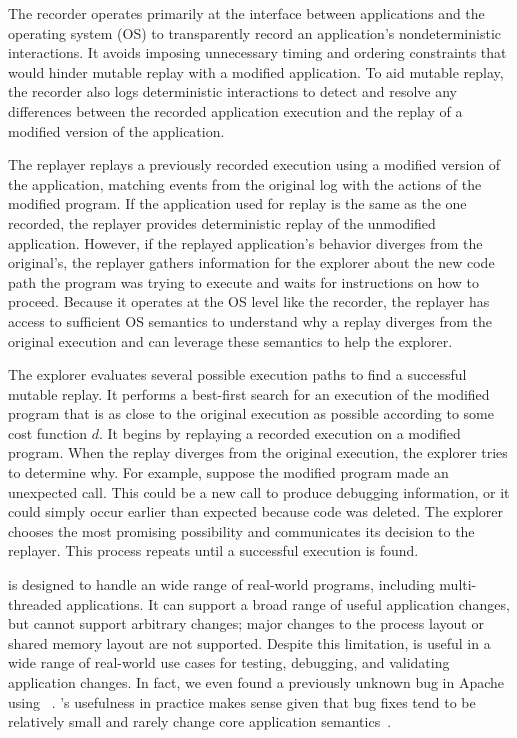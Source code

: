 The recorder operates primarily at the interface between applications and the
operating system (OS) to transparently record an application's nondeterministic
interactions. It avoids imposing unnecessary timing and ordering constraints
that would hinder mutable replay with a modified application.  To aid mutable
replay, the recorder also logs deterministic interactions to detect and
resolve any differences between the recorded application execution and the
replay of a modified version of the application.

The replayer replays a previously recorded execution using a modified version
of the application, matching events from the original
log with the actions of the modified program.
If the application used for replay is the same as the one recorded, the replayer
provides deterministic replay of the unmodified application.  However,
if the replayed application's behavior diverges from the original's,
the replayer gathers information for the explorer about the new code
path the program was trying to execute and waits for instructions on
how to proceed.  Because it operates at the OS level like the
recorder, the replayer has access to sufficient OS semantics to
understand why a replay diverges from the original execution and can
leverage these semantics to help the explorer.

The explorer evaluates several possible execution paths to find a successful
mutable replay.  It performs a best-first search for an execution of
the modified program that is as close to the original execution as
possible according to some cost function $d$. It begins by replaying a
recorded execution on a modified program. When the replay diverges
from the original execution, the explorer tries to determine
why. For example, suppose the modified program made an unexpected
 call. This could be a new call to produce debugging
information, or it could simply occur earlier than expected because
code was deleted. The explorer chooses the most promising possibility
and communicates its decision to the replayer. This process repeats
until a successful execution is found.

{\dora} is designed to handle an wide range of real-world programs,
including multi-threaded applications. It can support a broad range
of useful application changes, but cannot support arbitrary
changes; major changes to the process layout or shared memory
layout are not supported. Despite this limitation,
{\dora} is useful in a wide range of real-world use cases for
testing, debugging, and validating application changes.  In fact, we
even found a previously unknown bug in Apache using {\dora}~\cite{apache-bug-53131}.
{\dora}'s usefulness in practice makes sense given
that bug fixes tend to be relatively small and rarely change core
application semantics~\cite{delta,mreplay-feas}.

